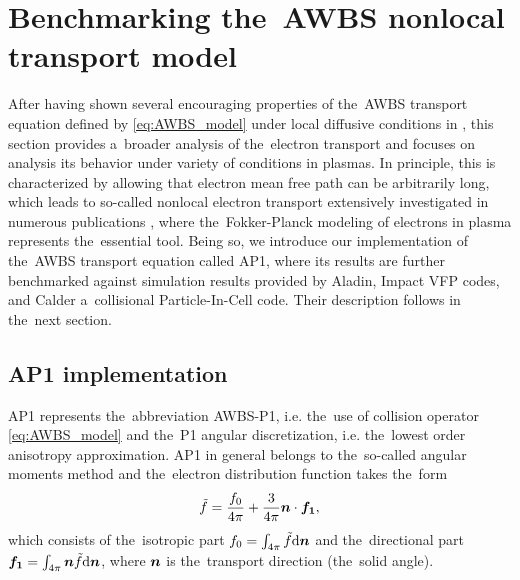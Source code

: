 \section{Benchmarking the~AWBS nonlocal transport model}
\label{sec:BenchmarkingAWBS}
After having shown several encouraging properties of the~AWBS transport 
equation defined by \eqref{eq:AWBS_model} under local diffusive conditions
in , this section provides a~broader analysis
of the~electron transport and focuses on analysis its behavior under variety of
conditions in plasmas. In principle, this is characterized by allowing that
electron mean free path can be arbitrarily long, which leads to so-called 
nonlocal electron transport extensively investigated in numerous publications 
\cite{Malone_1975_15, Colombant_PoP2005, Bell_1981_83, LMV_1983_7, Brantov_Nonlocal_electron_transport_1998, schurtz2000, Sorbo_2015}, where the~Fokker-Planck
modeling of electrons in plasma represents the~essential tool. Being so, 
we introduce our implementation of the~AWBS transport equation called AP1,
where its results are further benchmarked against simulation results
provided by Aladin, Impact VFP codes, and Calder a~collisional Particle-In-Cell
code. Their description follows in the~next section.

\subsection{AP1 implementation}
\label{sec:C7code}

AP1 represents the~abbreviation AWBS-P1, i.e. the~use of collision operator 
\eqref{eq:AWBS_model} and the~P1 angular discretization, i.e. the~lowest order 
anisotropy approximation. AP1 in general belongs to the~so-called angular 
moments method and the~electron distribution function takes the~form
\begin{equation}
  \tilde{f} = \frac{f_0}{4\pi} + \frac{3}{4\pi}\boldsymbol{n}\cdot\boldsymbol{f_1} , 
  \nonumber \label{eq:P1approximation}
\end{equation}
which consists of the~isotropic part $f_0 = \int_{4\pi} \tilde{f} \text{d}\boldsymbol{n}$ 
and the~directional part $\boldsymbol{f_1} = \int_{4\pi} \boldsymbol{n}
\tilde{f} \text{d}\boldsymbol{n}$, where $\boldsymbol{n}$ is the~transport direction (the~solid angle).

